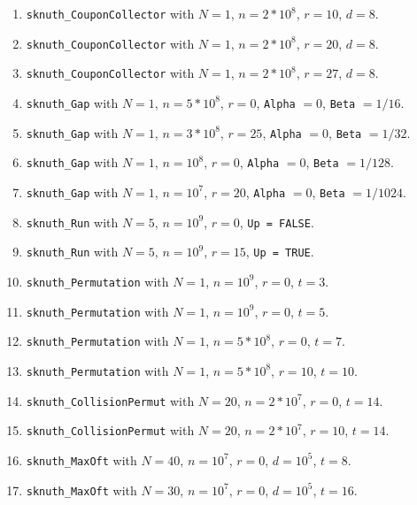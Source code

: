 \begin{enumerate}
  \item {\tt sknuth\_CouponCollector} with $N=1$, $n=2*10^8$, $r=10$, $d=8$.

  \item {\tt sknuth\_CouponCollector} with $N=1$, $n=2*10^8$, $r=20$, $d=8$.

  \item {\tt sknuth\_CouponCollector} with $N=1$, $n=2*10^8$, $r=27$, $d=8$.

  \item {\tt sknuth\_Gap} with $N=1$, $n=5*10^8$, $r=0$, {\tt Alpha} $=0$,
    {\tt Beta} $=1/16$.

  \item {\tt sknuth\_Gap} with $N=1$, $n=3*10^8$, $r=25$, {\tt Alpha} $=0$,
    {\tt Beta} $=1/32$.

  \item {\tt sknuth\_Gap} with $N=1$, $n=10^8$, $r=0$, {\tt Alpha} $=0$,
    {\tt Beta} $=1/128$.

  \item {\tt sknuth\_Gap} with $N=1$, $n=10^7$, $r=20$, {\tt Alpha} $=0$,
   {\tt Beta} $=1/1024$.

  \item {\tt sknuth\_Run}  with $N=5$, $n=10^9$, $r=0$, {\tt Up = FALSE}.

  \item {\tt sknuth\_Run}  with $N=5$, $n=10^9$, $r=15$, {\tt Up = TRUE}.

  \item {\tt sknuth\_Permutation} with $N=1$, $n=10^9$, $r=0$, $t=3$.

  \item {\tt sknuth\_Permutation} with $N=1$, $n=10^9$, $r=0$, $t=5$.

  \item {\tt sknuth\_Permutation} with $N=1$, $n=5*10^8$, $r=0$, $t=7$.

  \item {\tt sknuth\_Permutation} with $N=1$, $n=5*10^8$, $r=10$, $t=10$.

  \item {\tt sknuth\_CollisionPermut} with $N=20$, $n=2*10^7$, $r=0$, $t=14$.

  \item {\tt sknuth\_CollisionPermut} with $N=20$, $n=2*10^7$, $r=10$, $t=14$.

  \item {\tt sknuth\_MaxOft} with $N=40$, $n=10^7$, $r=0$, $d=10^5$, $t=8$.

  \item {\tt sknuth\_MaxOft} with $N=30$, $n=10^7$, $r=0$, $d=10^5$, $t=16$.


\end{enumerate}
